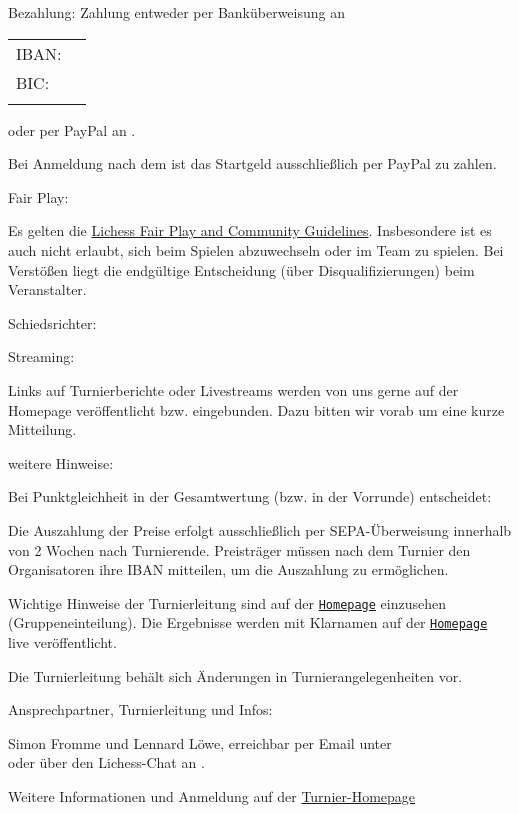\documentclass[paper=a4, fontsize=10pt]{scrartcl}
\begin{document}
\begin{basedescript}{\desclabelstyle{\multilinelabel}\desclabelwidth{10em}}
\item[Bezahlung:]
  Zahlung entweder per Banküberweisung an

  \hspace{2em}\begin{tabular}[t]{ll}
    IBAN: & \bankFormat{\IBAN} \\
    BIC:  & \bankFormat{\BIC} \\
          & \bankFormat{\bank}
  \end{tabular}

  oder per PayPal an \texttt{\paypalEmail}.

  Bei Anmeldung nach dem ist das
  Startgeld ausschließlich per PayPal zu zahlen.

\item[Fair Play:]

  Es gelten die \href{\lichessTermsOfServiceURL}{Lichess Fair Play and
    Community Guidelines}. Insbesondere ist es auch nicht erlaubt,
  sich beim Spielen abzuwechseln oder im Team zu spielen. Bei
  Verstößen liegt die endgültige Entscheidung (über
  Disqualifizierungen) beim Veranstalter.

\item[Schiedsrichter:]

  \arbiter{}

\item[Streaming:]

  Links auf Turnierberichte oder Livestreams werden von uns gerne auf
  der Homepage veröffentlicht bzw. eingebunden. Dazu bitten wir vorab
  um eine kurze Mitteilung.

\item[weitere Hinweise:]

  Bei Punktgleichheit in der Gesamtwertung (bzw. in der Vorrunde)
  entscheidet:

  \enum{\tiebreak}

  Die Auszahlung der Preise erfolgt ausschließlich per
  SEPA-Überweisung innerhalb von 2 Wochen nach
  Turnierende. Preisträger müssen nach dem Turnier den Organisatoren
  ihre IBAN mitteilen, um die Auszahlung zu ermöglichen.

  Wichtige Hinweise der Turnierleitung sind auf der
  \href{\tournamentURL}{\texttt{Homepage}} einzusehen
  (Gruppeneinteilung). Die Ergebnisse werden mit Klarnamen auf der
  \href{\tournamentURL}{\texttt{Homepage}} live veröffentlicht.

  Die Turnierleitung behält sich Änderungen in Turnierangelegenheiten
  vor.

\item[Ansprechpartner, Turnierleitung und Infos:]

  Simon Fromme und Lennard Löwe, erreichbar per Email unter
  \\ \email{\tournamentEmail} oder über den Lichess-Chat an
  .

  Weitere Informationen und Anmeldung auf der
  \href{\tournamentURL}{Turnier-Homepage}
\end{basedescript}
\end{document}
